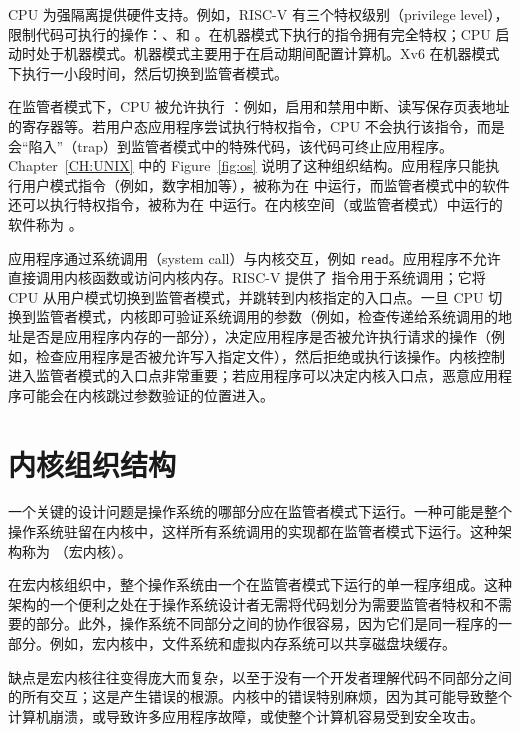 CPU 为强隔离提供硬件支持。例如，RISC-V 有三个特权级别（privilege level），限制代码可执行的操作：、和 。在机器模式下执行的指令拥有完全特权；CPU 启动时处于机器模式。机器模式主要用于在启动期间配置计算机。Xv6 在机器模式下执行一小段时间，然后切换到监管者模式。

在监管者模式下，CPU 被允许执行 ：例如，启用和禁用中断、读写保存页表地址的寄存器等。若用户态应用程序尝试执行特权指令，CPU 不会执行该指令，而是会``陷入''（trap）到监管者模式中的特殊代码，该代码可终止应用程序。
Chapter~\ref{CH:UNIX}
中的 Figure~\ref{fig:os} 说明了这种组织结构。应用程序只能执行用户模式指令（例如，数字相加等），被称为在
中运行，而监管者模式中的软件还可以执行特权指令，被称为在
中运行。在内核空间（或监管者模式）中运行的软件称为
。

应用程序通过系统调用（system call）与内核交互，例如 {\tt read}。应用程序不允许直接调用内核函数或访问内核内存。RISC-V 提供了  指令用于系统调用；它将 CPU 从用户模式切换到监管者模式，并跳转到内核指定的入口点。一旦 CPU 切换到监管者模式，内核即可验证系统调用的参数（例如，检查传递给系统调用的地址是否是应用程序内存的一部分），决定应用程序是否被允许执行请求的操作（例如，检查应用程序是否被允许写入指定文件），然后拒绝或执行该操作。内核控制进入监管者模式的入口点非常重要；若应用程序可以决定内核入口点，恶意应用程序可能会在内核跳过参数验证的位置进入。

\section{内核组织结构}

一个关键的设计问题是操作系统的哪部分应在监管者模式下运行。一种可能是整个操作系统驻留在内核中，这样所有系统调用的实现都在监管者模式下运行。这种架构称为 （宏内核）。

在宏内核组织中，整个操作系统由一个在监管者模式下运行的单一程序组成。这种架构的一个便利之处在于操作系统设计者无需将代码划分为需要监管者特权和不需要的部分。此外，操作系统不同部分之间的协作很容易，因为它们是同一程序的一部分。例如，宏内核中，文件系统和虚拟内存系统可以共享磁盘块缓存。

缺点是宏内核往往变得庞大而复杂，以至于没有一个开发者理解代码不同部分之间的所有交互；这是产生错误的根源。内核中的错误特别麻烦，因为其可能导致整个计算机崩溃，或导致许多应用程序故障，或使整个计算机容易受到安全攻击。

